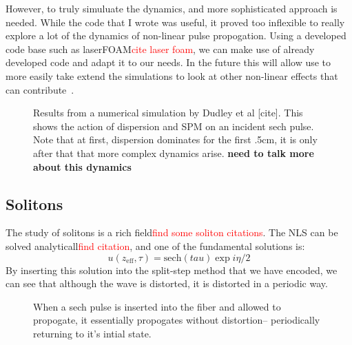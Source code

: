 \documentclass[12pt, titlepage]{article}
\begin{document}
\begin{spacing}{1.1}
\begin{figure}[h!]
                              \label{fig:initialex}
                              \end{figure}

However, to truly simuluate the dynamics, and more sophisticated approach is needed. While the code that I wrote was useful, it proved too inflexible to really explore a lot of the dynamics of non-linear pulse propogation. Using a developed code base such as laserFOAM\textcolor{red}{cite laser foam}, we can make use of
already developed code and adapt it to our needs. In the future this will allow use to more easily take
extend the simulations to look at other non-linear effects that can contribute~\cite{dudrev}.



\begin{figure}[h!]
 \centering
                    \caption{Results from a numerical simulation by Dudley et al [cite]. This shows the action of dispersion and SPM on an incident sech pulse. Note that at first, dispersion dominates for the first .5cm, it is only after that that more complex dynamics arise. \textbf{need to talk more about this dynamics}}
                    
                              \label{intial spectrum}
                              \end{figure}

\subsection{Solitons}
The study of solitons is a rich field\textcolor{red}{find some soliton citations}. The NLS can be solved analyticall\textcolor{red}{find citation}, and one of the fundamental solutions is:
\begin{equation}
u(z_\text{eff}, \tau) = \text{sech}( 
tau) \exp{i\eta/2}
\end{equation}
By inserting this solution into the split-step method that we have encoded, we can see that although the wave is distorted, it is distorted in a periodic way.
\begin{figure}[h!]
\centering
                   \caption{When a sech pulse is inserted into the fiber and allowed to propogate, it essentially propogates without distortion-- periodically returning to it's intial state. }
                   

\end{figure}
\end{spacing}
\end{document}
